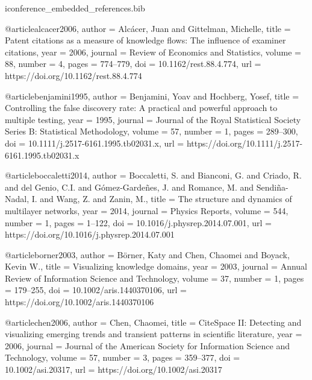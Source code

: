 \begin{filecontents*}[overwrite]{iconference_embedded_references.bib}

@article{alcacer2006,
  author = {Alc{\'{a}}cer, Juan and Gittelman, Michelle},
  title = {Patent citations as a measure of knowledge flows: The influence of examiner citations},
  year = {2006},
  journal = {Review of Economics and Statistics},
  volume = {88},
  number = {4},
  pages = {774--779},
  doi = {10.1162/rest.88.4.774},
  url = {https://doi.org/10.1162/rest.88.4.774}
}

@article{benjamini1995,
  author = {Benjamini, Yoav and Hochberg, Yosef},
  title = {Controlling the false discovery rate: A practical and powerful approach to multiple testing},
  year = {1995},
  journal = {Journal of the Royal Statistical Society Series B: Statistical Methodology},
  volume = {57},
  number = {1},
  pages = {289--300},
  doi = {10.1111/j.2517-6161.1995.tb02031.x},
  url = {https://doi.org/10.1111/j.2517-6161.1995.tb02031.x}
}

@article{boccaletti2014,
  author = {Boccaletti, S. and Bianconi, G. and Criado, R. and del Genio, C.I. and G{\'{o}}mez-Garde{\~{n}}es, J. and Romance, M. and Sendi{\~{n}}a-Nadal, I. and Wang, Z. and Zanin, M.},
  title = {The structure and dynamics of multilayer networks},
  year = {2014},
  journal = {Physics Reports},
  volume = {544},
  number = {1},
  pages = {1--122},
  doi = {10.1016/j.physrep.2014.07.001},
  url = {https://doi.org/10.1016/j.physrep.2014.07.001}
}

@article{borner2003,
  author = {B{\"{o}}rner, Katy and Chen, Chaomei and Boyack, Kevin W.},
  title = {Visualizing knowledge domains},
  year = {2003},
  journal = {Annual Review of Information Science and Technology},
  volume = {37},
  number = {1},
  pages = {179--255},
  doi = {10.1002/aris.1440370106},
  url = {https://doi.org/10.1002/aris.1440370106}
}

@article{chen2006,
  author = {Chen, Chaomei},
  title = {{CiteSpace II}: Detecting and visualizing emerging trends and transient patterns in scientific literature},
  year = {2006},
  journal = {Journal of the American Society for Information Science and Technology},
  volume = {57},
  number = {3},
  pages = {359--377},
  doi = {10.1002/asi.20317},
  url = {https://doi.org/10.1002/asi.20317}
}


\end{filecontents*}
